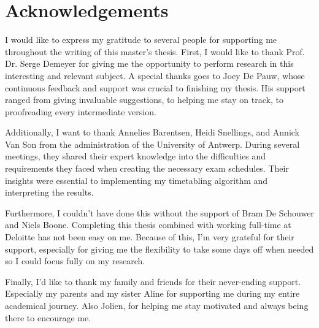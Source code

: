 
\section*{Acknowledgements}

I would like to express my gratitude to several people for supporting me throughout the writing of this master's thesis. First, I would like to thank Prof. Dr. Serge Demeyer for giving me the opportunity to perform research in this interesting and relevant subject. A special thanks goes to Joey De Pauw, whose continuous feedback and support was crucial to finishing my thesis. His support ranged from giving invaluable suggestions, to helping me stay on track, to proofreading every intermediate version. 

Additionally, I want to thank Annelies Barentsen, Heidi Snellings, and Annick Van Son from the administration of the University of Antwerp. During several meetings, they shared their expert knowledge into the difficulties and requirements they faced when creating the necessary exam schedules. Their insights were essential to implementing my timetabling algorithm and interpreting the results.

Furthermore, I couldn't have done this without the support of Bram De Schouwer and Niels Boone. Completing this thesis combined with working full-time at Deloitte has not been easy on me. Because of this, I'm very grateful for their support, especially for giving me the flexibility to take some days off when needed so I could focus fully on my research. 

Finally, I'd like to thank my family and friends for their never-ending support. Especially my parents and my sister Aline for supporting me during my entire academical journey. Also Jolien, for helping me stay motivated and always being there to encourage me.
